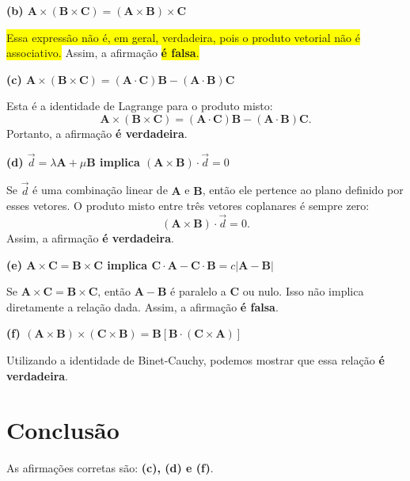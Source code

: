 \documentclass[a4paper,12pt]{article}
\begin{document}
\begin{flushleft}
\textbf{(b) $\mathbf{A} \times (\mathbf{B} \times \mathbf{C}) = (\mathbf{A} \times \mathbf{B}) \times \mathbf{C}$}

\colorbox{yellow}{Essa expressão não é, em geral, verdadeira, pois o produto vetorial não é associativo.} 
Assim, a afirmação \colorbox{yellow}{\textbf{é falsa}.}

\textbf{(c) $\mathbf{A} \times (\mathbf{B} \times \mathbf{C}) = (\mathbf{A} \cdot \mathbf{C}) \mathbf{B} - (\mathbf{A} \cdot \mathbf{B}) \mathbf{C}$}

Esta é a identidade de Lagrange para o produto misto:
\begin{equation}
    \mathbf{A} \times (\mathbf{B} \times \mathbf{C}) = (\mathbf{A} \cdot \mathbf{C})\mathbf{B} - (\mathbf{A} \cdot \mathbf{B})\mathbf{C}.
\end{equation}
Portanto, a afirmação \colorbox{green!30}{\textbf{é verdadeira}.}

\textbf{(d) $\vec{d} = \lambda \mathbf{A} + \mu \mathbf{B}$ implica $(\mathbf{A} \times \mathbf{B}) \cdot \vec{d} = 0$}

Se $\vec{d}$ é uma combinação linear de $\mathbf{A}$ e $\mathbf{B}$, então ele pertence ao plano definido por esses vetores. O produto misto entre três vetores coplanares é sempre zero:
\begin{equation}
    (\mathbf{A} \times \mathbf{B}) \cdot \vec{d} = 0.
\end{equation}
Assim, a afirmação \colorbox{green!30}{\textbf{é verdadeira}.}

\textbf{(e) $\mathbf{A} \times \mathbf{C} = \mathbf{B} \times \mathbf{C}$ implica $\mathbf{C} \cdot \mathbf{A} - \mathbf{C} \cdot \mathbf{B} = c|\mathbf{A} - \mathbf{B}|$}

Se $\mathbf{A} \times \mathbf{C} = \mathbf{B} \times \mathbf{C}$, então $\mathbf{A} - \mathbf{B}$ é paralelo a $\mathbf{C}$ ou nulo. Isso não implica diretamente a relação dada. Assim, a afirmação \textbf{é falsa}.

\textbf{(f) $(\mathbf{A} \times \mathbf{B}) \times (\mathbf{C} \times \mathbf{B}) = \mathbf{B} [\mathbf{B} \cdot (\mathbf{C} \times \mathbf{A})]$}

Utilizando a identidade de Binet-Cauchy, podemos mostrar que essa relação \textbf{é \colorbox{green!30}{verdadeira}}.

\section*{Conclusão}
As afirmações corretas são: \textbf{(c), (d) e (f)}.

\end{flushleft}
\end{document}
